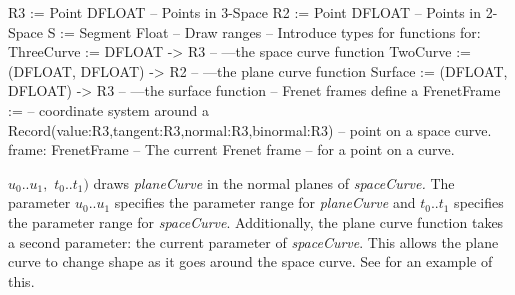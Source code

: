\begin{xmpLinesPlain}
R3 := Point DFLOAT                                       -- Points in 3-Space
R2 := Point DFLOAT                                       -- Points in 2-Space
S := Segment Float                                       -- Draw ranges
                                                         -- Introduce types for functions for:
ThreeCurve := DFLOAT -> R3                               -- \quad{}---the space curve function
TwoCurve := (DFLOAT, DFLOAT) -> R2                       -- \quad{}---the plane curve function
Surface := (DFLOAT, DFLOAT) -> R3                        -- \quad{}---the surface function
                                                         -- Frenet frames define a
FrenetFrame :=                                           -- \quad{}coordinate system around a
   Record(value:R3,tangent:R3,normal:R3,binormal:R3)     -- \quad{}point on a space curve.
frame: FrenetFrame                                       -- The current Frenet frame
                                                         -- \quad{}for a point on a curve.
\end{xmpLinesPlain}

$u_0 .. u_1,$ $t_0 .. t_1)$
draws {\it planeCurve} in the normal planes of {\it spaceCurve.}
The parameter $u_0 .. u_1$ specifies
the parameter range for {\it planeCurve}
and $t_0 .. t_1$ specifies the parameter range for {\it spaceCurve}.
Additionally, the plane curve function takes
a second parameter: the current parameter of {\it spaceCurve}.
This allows the plane curve to change shape
as it goes around the space curve.
See  for an example of this.
%

